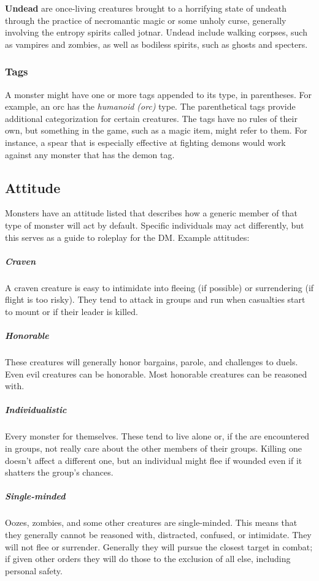 \textbf*{Undead} are once-living creatures brought to a horrifying state of undeath through the practice of necromantic magic or some unholy curse, generally involving the entropy spirits called jotnar. Undead include walking corpses, such as vampires and zombies, as well as bodiless spirits, such as ghosts and specters.

\subsubsection{Tags}

A monster might have one or more tags appended to its type, in parentheses. For example, an orc has the \textit{humanoid (orc)} type. The parenthetical tags provide additional categorization for certain creatures. The tags have no rules of their own, but something in the game, such as a magic item, might refer to them. For instance, a spear that is especially effective at fighting demons would work against any monster that has the demon tag.

\subsection{Attitude}

Monsters have an attitude listed that describes how a generic member of that type of monster will act by default. Specific individuals may act differently, but this serves as a guide to roleplay for the DM. Example attitudes:

\subparagraph*{Craven} A craven creature is easy to intimidate into fleeing (if possible) or surrendering (if flight is too risky). They tend to attack in groups and run when casualties start to mount or if their leader is killed.

\subparagraph*{Honorable} These creatures will generally honor bargains, parole, and challenges to duels. Even evil creatures can be honorable. Most honorable creatures can be reasoned with.

\subparagraph*{Individualistic} Every monster for themselves. These tend to live alone or, if the are encountered in groups, not really care about the other members of their groups. Killing one doesn't affect a different one, but an individual might flee if wounded even if it shatters the group's chances.

\subparagraph*{Single-minded} Oozes, zombies, and some other creatures are single-minded. This means that they generally cannot be reasoned with, distracted, confused, or intimidate. They will not flee or surrender. Generally they will pursue the closest target in combat; if given other orders they will do those to the exclusion of all else, including personal safety.

